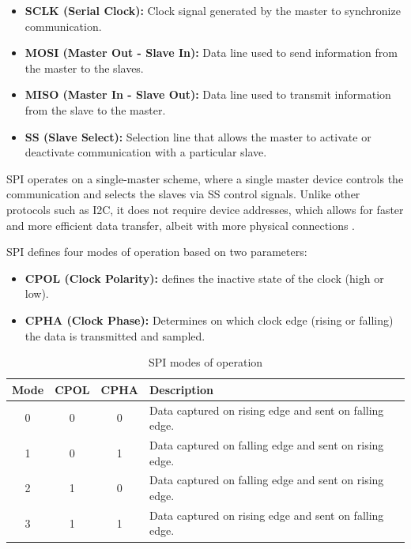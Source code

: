 \begin{itemize}
	\item \textbf{SCLK (Serial Clock):} Clock signal generated by the master to synchronize communication.
	\item \textbf{MOSI (Master Out - Slave In):} Data line used to send information from the master to the slaves.
	\item \textbf{MISO (Master In - Slave Out):} Data line used to transmit information from the slave to the master.
	\item \textbf{SS (Slave Select):} Selection line that allows the master to activate or deactivate communication with a particular slave.
\end{itemize}

SPI operates on a single-master scheme, where a single master device controls the communication and selects the slaves via SS control signals. Unlike other protocols such as I2C, it does not require device addresses, which allows for faster and more efficient data transfer, albeit with more physical connections \cite{ref16}.

SPI defines four modes of operation based on two parameters:

\begin{itemize}
	\item \textbf{CPOL (Clock Polarity):} defines the inactive state of the clock (high or low).
	\item \textbf{CPHA (Clock Phase):} Determines on which clock edge (rising or falling) the data is transmitted and sampled.
\end{itemize}

\begin{table}[H]
	\centering
	\begin{tabular}{|c|c|c|l|}
		\hline
		\textbf{Mode} & \textbf{CPOL} & \textbf{CPHA} & \textbf{Description} \\ \hline
		0             & 0             & 0             & Data captured on rising edge and sent on falling edge. \\ \hline
		1             & 0             & 1             & Data captured on falling edge and sent on rising edge. \\ \hline
		2             & 1             & 0             & Data captured on falling edge and sent on rising edge. \\ \hline
		3             & 1             & 1             & Data captured on rising edge and sent on falling edge. \\ \hline
	\end{tabular}
	\caption{SPI modes of operation}
	\label{tab:spi_modes}
\end{table}


